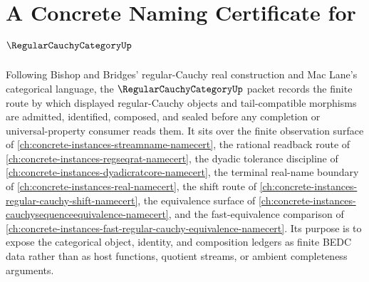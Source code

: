 \chapter{A Concrete Naming Certificate for $\RegularCauchyCategoryUp$}
\label{ch:concrete-instances-regular-cauchy-category-namecert}

Following Bishop and Bridges' regular-Cauchy real construction and Mac Lane's categorical language, the $\RegularCauchyCategoryUp$ packet records the finite route by which displayed regular-Cauchy objects and tail-compatible morphisms are admitted, identified, composed, and sealed before any completion or universal-property consumer reads them. It sits over the finite observation surface of \autoref{ch:concrete-instances-streamname-namecert}, the rational readback route of \autoref{ch:concrete-instances-regseqrat-namecert}, the dyadic tolerance discipline of \autoref{ch:concrete-instances-dyadicratcore-namecert}, the terminal real-name boundary of \autoref{ch:concrete-instances-real-namecert}, the shift route of \autoref{ch:concrete-instances-regular-cauchy-shift-namecert}, the equivalence surface of \autoref{ch:concrete-instances-cauchysequenceequivalence-namecert}, and the fast-equivalence comparison of \autoref{ch:concrete-instances-fast-regular-cauchy-equivalence-namecert}. Its purpose is to expose the categorical object, identity, and composition ledgers as finite BEDC data rather than as host functions, quotient streams, or ambient completeness arguments.

